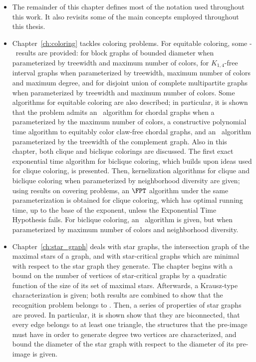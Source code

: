 \begin{itemize}
    \item The remainder of this chapter defines most of the notation used throughout this work.
    It also revisits some of the main concepts employed throughout this thesis.
    \item Chapter~\ref{ch:coloring} tackles coloring problems.
    For equitable coloring, some \W[1]-\Hness\ results are provided: for block graphs of bounded diameter when parameterized by treewidth and maximum number of colors, for $K_{1,4}$-free interval graphs when parameterized by treewidth, maximum number of colors and maximum degree, and for disjoint union of complete multipartite graphs when parameterized by treewidth and maximum number of colors.
    Some algorithms for equitable coloring are also described; in particular, it is shown that the problem admits an \XP\ algorithm for chordal graphs when a parameterized by the maximum number of colors, a constructive polynomial time algorithm to equitably color claw-free chordal graphs, and an \FPT\ algorithm parameterized by the treewidth of the complement graph.
    Also in this chapter, both clique and biclique colorings are discussed.
    The first exact exponential time algorithm for biclique coloring, which builds upon ideas used for clique coloring, is presented.
    Then, kernelization algorithms for clique and biclique coloring when parameterized by neighborhood diversity are given; using results on covering problems, an $\FPT$ algorithm under the same parameterization is obtained for clique coloring, which has optimal running time, up to the base of the exponent, unless the Exponential Time Hypothesis fails.
    For biclique coloring, an \FPT\ algorithm is given, but when parameterized by maximum number of colors and neighborhood diversity.
    \item Chapter~\ref{ch:star_graph} deals with star graphs, the intersection graph of the maximal stars of a graph, and with star-critical graphs which are minimal with respect to the star graph they generate.
    The chapter begins with a bound on the number of vertices of star-critical graphs by a quadratic function of the size of its set of maximal stars.
    Afterwards, a Krausz-type characterization is given; both results are combined to show that the recognition problem belongs to \NP.
    Then, a series of properties of star graphs are proved.
    In particular, it is shown show that they are biconnected, that every edge belongs to at least one triangle, the structures that the pre-image must have in order to generate degree two vertices are characterized, and bound the diameter of the star graph with respect to the diameter of its pre-image is given.

\end{itemize}
